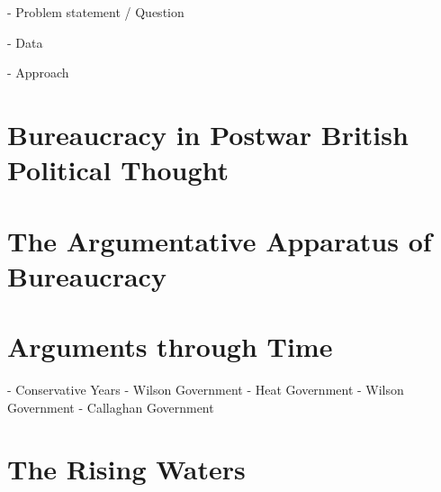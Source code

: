 \documentclass{article}
\begin{document}
- Problem statement / Question

- Data

- Approach


\section{Bureaucracy in Postwar British Political Thought}


\section{The Argumentative Apparatus of Bureaucracy}


\section{Arguments through Time}
- Conservative Years
- Wilson Government
- Heat Government
- Wilson Government
- Callaghan Government

\section{The Rising Waters}
\end{document}
